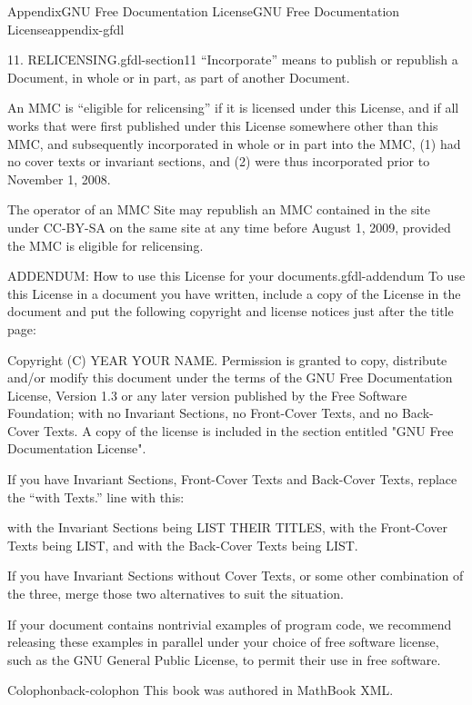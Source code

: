 \documentclass[oneside,10pt,]{book}
\newcommand{\xreffont}{\relax}
\numberwithin{equation}{section}
\providecommand\phantomsection{}
\begin{document}
\begin{appendixptx}{Appendix}{GNU Free Documentation License}{}{GNU Free Documentation License}{}{}{appendix-gfdl}
\begin{paragraphs}{11. RELICENSING.}{gfdl-section11}
``Incorporate'' means to publish or republish a Document, in whole or in part, as part of another Document.%
\par
An MMC is ``eligible for relicensing'' if it is licensed under this License, and if all works that were first published under this License somewhere other than this MMC, and subsequently incorporated in whole or in part into the MMC, (1) had no cover texts or invariant sections, and (2) were thus incorporated prior to November 1, 2008.%
\par
The operator of an MMC Site may republish an MMC contained in the site under CC-BY-SA on the same site at any time before August 1, 2009, provided the MMC is eligible for relicensing.%
\end{paragraphs}%
\begin{paragraphs}{ADDENDUM: How to use this License for your documents.}{gfdl-addendum}%
To use this License in a document you have written, include a copy of the License in the document and put the following copyright and license notices just after the title page:%
\begin{preformatted}
Copyright (C)  YEAR  YOUR NAME.
Permission is granted to copy, distribute and/or modify this document
under the terms of the GNU Free Documentation License, Version 1.3
or any later version published by the Free Software Foundation;
with no Invariant Sections, no Front-Cover Texts, and no Back-Cover Texts.
A copy of the license is included in the section entitled "GNU
Free Documentation License".
\end{preformatted}
If you have Invariant Sections, Front-Cover Texts and Back-Cover Texts, replace the ``with\textellipsis{} Texts.'' line with this:%
\begin{preformatted}
with the Invariant Sections being LIST THEIR TITLES, with the
Front-Cover Texts being LIST, and with the Back-Cover Texts being LIST.
\end{preformatted}
If you have Invariant Sections without Cover Texts, or some other combination of the three, merge those two alternatives to suit the situation.%
\par
If your document contains nontrivial examples of program code, we recommend releasing these examples in parallel under your choice of free software license, such as the GNU General Public License, to permit their use in free software.%
\end{paragraphs}%
\end{appendixptx}
%
\backmatter%
%
\clearpage\phantomsection%
%
%
{\xreffont\printindex}
%
\clearpage
\pagestyle{empty}
\begin{backcolophon}{Colophon}{back-colophon}%
This book was authored in MathBook XML.%
\end{backcolophon}%
\cleardoublepage%
%
\end{document}
